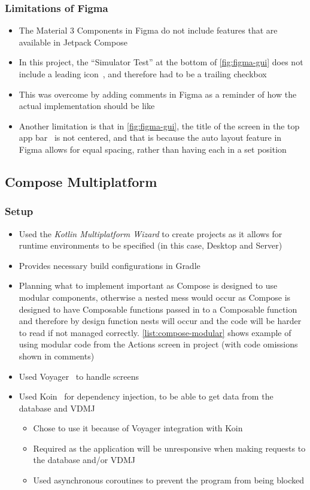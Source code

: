 \documentclass[../dissertation.tex]{subfiles}
\begin{document}
\subsubsection{Limitations of Figma}
\begin{itemize}
  \item The Material 3 Components in Figma do not include features that are available in
    Jetpack Compose
  \item In this project, the \enquote{Simulator Test} at the bottom of \autoref{fig:figma-gui}
    does not include a leading icon~\cite{material:lists}, and therefore had to be a trailing
    checkbox
  \item This was overcome by adding comments in Figma as a reminder of how the actual implementation
    should be like
  \item Another limitation is that in \autoref{fig:figma-gui}, the title of the screen in the
    top app bar~\cite{material:top-app-bar} is not centered, and that is because the auto layout
    feature in Figma allows for equal spacing, rather than having each in a set position
\end{itemize}


\subsection{Compose Multiplatform}
\subsubsection{Setup}
\begin{itemize}
  \item Used the \textit{Kotlin Multiplatform Wizard} to create projects as it allows
    for runtime environments to be specified (in this case, Desktop and Server)
  \item Provides necessary build configurations in Gradle
  \item Planning what to implement important as Compose is designed to use modular
    components, otherwise a nested mess would occur as Compose is designed to have
    Composable functions passed in to a Composable function and therefore by design
    function nests will occur and the code will be harder to read if not managed correctly.
    \autoref{list:compose-modular} shows example of using modular code
    from the Actions screen in project (with code omissions shown in comments)
  \item Used Voyager~\cite{voyager} to handle screens
  \item Used Koin~\cite{koin} for dependency injection, to be able to get data from the
    database and VDMJ
    \begin{itemize}
      \item Chose to use it because of Voyager integration with Koin~\cite{voyager:koin}
      \item Required as the application will be unresponsive when making requests
        to the database and/or VDMJ
      \item Used asynchronous coroutines to prevent the program from being blocked
    \end{itemize}
\end{itemize}
\end{document}
